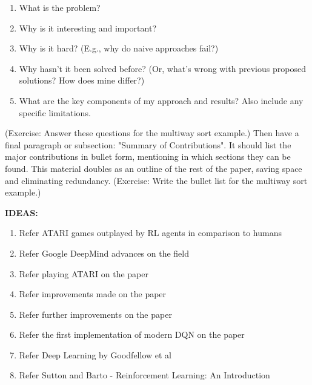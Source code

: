 \begin{enumerate}
\item What is the problem?
\item Why is it interesting and important?
\item Why is it hard? (E.g., why do naive approaches fail?)
\item Why hasn't it been solved before? (Or, what's wrong with previous proposed solutions? How does mine differ?)
\item What are the key components of my approach and results? Also include any specific limitations.
\end{enumerate}

(Exercise: Answer these questions for the multiway sort example.)
Then have a final paragraph or subsection: "Summary of Contributions". It should list the major contributions in bullet form, mentioning in which sections they can be found. This material doubles as an outline of the rest of the paper, saving space and eliminating redundancy.
(Exercise: Write the bullet list for the multiway sort example.)

\textbf{IDEAS:}
\begin{enumerate}
\item Refer ATARI games outplayed by RL agents in comparison to humans
\item Refer Google DeepMind advances on the field
\item Refer playing ATARI on the paper\cite{mnih_playing_2013}
\item Refer improvements made on the paper \cite{mnih_human-level_2015}
\item Refer further improvements on the paper \cite{lillicrap_continuous_2015}
\item Refer the first implementation of modern DQN on the paper \cite{van_hasselt_deep_2016}
\item Refer Deep Learning by Goodfellow et al \cite{goodfellow_deep_2016}
\item Refer Sutton and Barto - Reinforcement Learning: An Introduction \cite{sutton_reinforcement_2018}
\end{enumerate}
